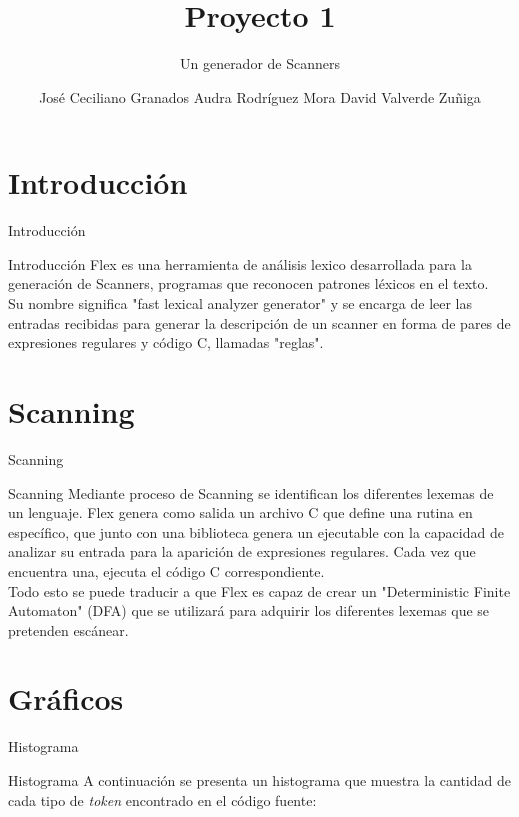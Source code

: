 \documentclass[10pt,xcolor={dvipsnames}]{beamer}
\title{Proyecto 1}
\subtitle{Un generador de Scanners}
\date{}
\author{
    José Ceciliano Granados\newline 2016087245
    \newline \newline
    Audra Rodríguez Mora \newline 2015101893
    \newline \newline
    David Valverde Zuñiga \newline 200922986
}
\institute{Instituto Tecnológico de Costa Rica
    \newline Compiladores e Intérpretes
    \newline I Semestre 2019 }
\begin{document}
    \maketitle

    \section{Introducción}
        \begin{frame}[fragile]{Introducción}
        \begin{alertblock}{Introducción}
                Flex es una herramienta de análisis lexico desarrollada para la generación de Scanners, programas que reconocen patrones léxicos en el texto.\\
                Su nombre significa "fast lexical analyzer generator" y se encarga de leer las entradas recibidas para generar la descripción de un scanner en forma de pares de expresiones regulares y código C, llamadas "reglas".\\

        \end{alertblock}
        \end{frame}

    \section{Scanning}
        \begin{frame}[fragile]{Scanning}
            \begin{alertblock}{Scanning}
                Mediante proceso de Scanning se identifican los diferentes lexemas de un lenguaje. Flex genera como salida un archivo C que define una rutina en específico, que junto con una biblioteca genera un ejecutable con la capacidad de analizar su entrada para la aparición de expresiones regulares. Cada vez que encuentra una, ejecuta el código C correspondiente.\\
                Todo esto se puede traducir a que Flex es capaz de crear un "Deterministic Finite Automaton" (DFA) que se utilizará para adquirir los diferentes lexemas que se pretenden escánear.
            \end{alertblock}
        \end{frame}


    \section{Gráficos}
        \begin{frame}{Histograma}
        \begin{alertblock}{Histograma}
            A continuación se presenta un histograma que muestra la cantidad de cada tipo de \textit{token} encontrado en el código fuente:
            \end{alertblock}
        \end{frame}
\end{document}
